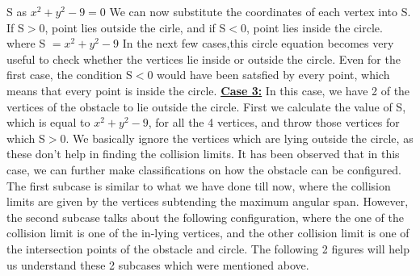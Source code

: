 \documentclass[12pt]{article}
\begin{document}
S as $x^2 + y^2 - 9 = 0$
\newline
We can now substitute the coordinates of each vertex into S.
\newline
If S$>$0, point lies outside the cirle, and if S$<$0, point lies inside the circle.
\newline
where S $=x^2 + y^2 - 9 $
\newline
In the next few cases,this circle equation becomes very useful to check whether the vertices lie inside or outside the circle. Even for the first case, the condition S$<$0 would have been satsfied by every point, which means that every point is inside the circle.
\newline
\newline
\underline{\textbf{Case 3:}}
\newline
In this case, we have 2 of the vertices of the obstacle to lie outside the circle. First we calculate the value of S, which is equal to $x^2 + y^2 - 9$, for all the 4 vertices, and throw those vertices for which S$>$0. We basically ignore the vertices which are lying outside the circle, as these don't help in finding the collision limits.
\newline
\newline
It has been observed that in this case, we can further make classifications on how the obstacle can be configured. The first subcase is similar to what we have done till now, where the collision limits are given by the vertices subtending the maximum angular span. However, the second subcase talks about the following configuration, where the one of the collision limit is one of the in-lying vertices, and the other collision limit is one of the intersection points of the obstacle and circle.
\newline
\newline
The following 2 figures will help us understand these 2 subcases which were mentioned above.
\end{document}
